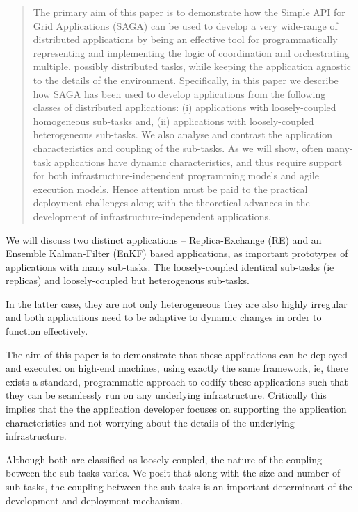 \documentclass[conference,final]{IEEEtran}
\newcommand{\up}{\vspace*{-1em}}
\begin{document}
\begin{abstract}
  The primary aim of this paper is to demonstrate how the Simple API
  for Grid Applications (SAGA) can be used to develop a very
  wide-range of distributed applications by being an effective tool
  for programmatically representing and implementing the logic of
  coordination and orchestrating multiple, possibly distributed tasks,
  while keeping the application agnostic to the details of the
  environment.  Specifically, in this paper we describe how SAGA has
  been used to develop applications from the following classes of
  distributed applications: (i) applications with loosely-coupled
  homogeneous sub-tasks and, (ii) applications with loosely-coupled
  heterogeneous sub-tasks. We also analyse and contrast the application
  characteristics and coupling of the sub-tasks.  As we will show,
  often many-task applications have dynamic characteristics, and thus
  require support for both infrastructure-independent programming
  models and agile execution models. Hence attention must be paid to
  the practical deployment challenges along with the theoretical
  advances in the development of infrastructure-independent
  applications.
\end{abstract}

\up

We will discuss two distinct applications -- Replica-Exchange (RE) and
an Ensemble Kalman-Filter (EnKF) based applications, as important
prototypes of applications with many sub-tasks.
The loosely-coupled identical sub-tasks (ie replicas) and loosely-coupled
but heterogenous sub-tasks.

In the latter case, they are not only heterogeneous they are also
highly irregular and both applications need to be adaptive to dynamic
changes in order to function effectively.

The aim of this paper is to demonstrate that these applications can be
deployed and executed on high-end machines, using exactly the same
framework, ie, there exists a standard, programmatic approach to
codify these applications such that they can be seamlessly run on any
underlying infrastructure. Critically this implies that the the
application developer focuses on supporting the application
characteristics and not worrying about the details of the underlying
infrastructure.

Although both are classified as loosely-coupled, the nature of the
coupling between the sub-tasks varies. We posit that along with the
size and number of sub-tasks, the coupling between the sub-tasks is an
important determinant of the development and deployment mechanism.
\end{document}
